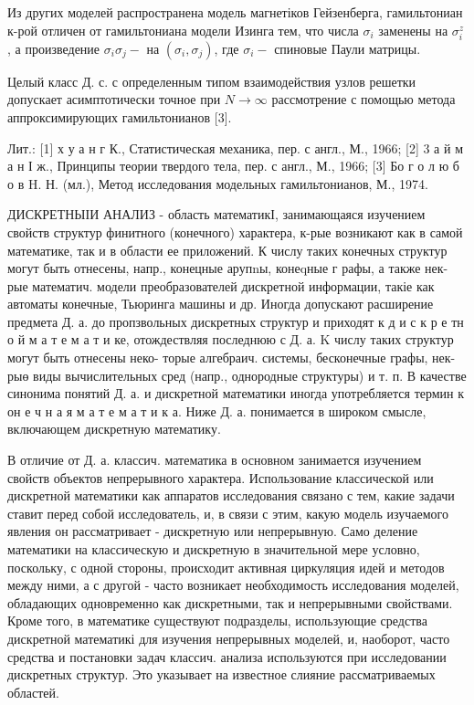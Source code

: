 \documentclass[10pt]{article}
\begin{document}
Из других моделей распространена модель магнетіков Гейзенберга, гамильтониан к-рой отличен от гамильтониана модели Изинга тем, что числа $\sigma_{i}$ заменены на $\sigma_{i}^{z}$, а произведение $\sigma_{i} \sigma_{j}-$ на $\left(\sigma_{i}, \sigma_{j}\right)$, где $\sigma_{i}-$ спиновые Паули матрицы.



Целый класс Д. с. с определенным типом взаимодействия узлов решетки допускает асимптотически точное при $N \rightarrow \infty$ рассмотрение с помощью метода аппроксимирующих гамильтонианов [3].



Лит.: [1] х у а н г К., Статистическая механика, пер. с англ., М., 1966; [2] 3 а й м а н І ж., Принципы теории твердого тела, пер. с англ., М., 1966; [3] Бо г о л ю б о в H. Н. (мл.), Метод исследования модельных гамильтонианов, М., 1974.



ДИСКРЕТНЫІИ АНАЛИЗ - область математикІ, занимающаяся изучением свойств структур финитного (конечного) характера, к-рые возникают как в самой математике, так и в области ее приложений. К числу таких конечных структур могут быть отнесены, напр., конецные арупnы, конеqные г рафы, а также нек-рые математич. модели преобразователей дискретной информации, такіе как автоматы конечные, Тьюринга машины и др. Иногда допускают расширение предмета Д. а. до пропзвольных дискретных структур и приходят к д и с к р е тн о й м а т е м а т и ке, отождествляя последнюю с Д. а. K числу таких структур могут быть отнесены неко- торые алгебраич. системы, бесконечные графы, нек-рыө виды вычислительных сред (напр., однородные структуры) и т. п. В качестве синонима понятий Д. а. и дискретной математики иногда употребляется термин к он е ч н а я м а т е м а т и к а. Ниже Д. а. понимается в широком смысле, включающем дискретную математику.



В отличие от Д. а. классич. математика в основном занимается изучением свойств объектов непрерывного характера. Использование классической или дискретной математики как аппаратов исследования связано с тем, какие задачи ставит перед собой исследователь, и, в связи с этим, какую модель изучаемого явления он рассматривает - дискретную или непрерывную. Само деление математики на классическую и дискретную в значительной мере условно, поскольку, с одной стороны, происходит активная циркуляция идей и методов между ними, а с другой - часто возникает необходимость исследования моделей, обладающих одновременно как дискретными, так и непрерывными свойствами. Кроме того, в математике существуют подразделы, использующие средства дискретной математикі для изучения непрерывных моделей, и, наоборот, часто средства и постановки задач классич. анализа используются при исследовании дискретных структур. Это указывает на известное слияние рассматриваемых областей.
\end{document}
